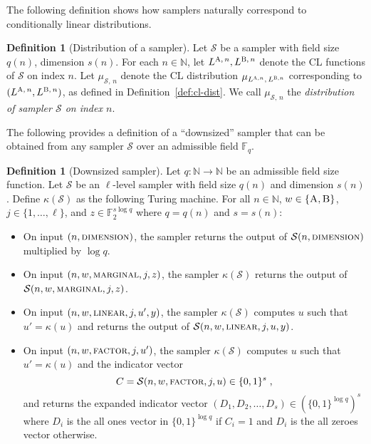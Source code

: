 \documentclass[11pt]{article}
\theoremstyle{definition}
\newtheorem{definition}[theorem]{Definition}
\newcommand{\N}{\ensuremath{\mathbb{N}}}
\newcommand{\F}{\ensuremath{\mathbb{F}}}
\newcommand{\downsize}{\kappa}
\newcommand{\sampler}{\mathcal{S}}
\newcommand{\gamestyle}[1]{\ensuremath{\textsc{#1}}\xspace}
\newcommand{\labelstyle}[1]{\ensuremath{\textsc{#1}}\xspace}
\newcommand{\alice}{\labelstyle{A}}
\newcommand{\bob}{\labelstyle{B}}
\begin{document}
The following definition shows how samplers naturally correspond to
conditionally linear distributions.
\begin{definition}[Distribution of a sampler]
  \label{def:sampler-sample}
  Let $\sampler$ be a sampler with field size $q(n)$, dimension $s(n)$.
  For each $n \in \N$, let $L^{\alice,\, n}, L^{\bob,\, n}$ denote the CL
  functions of $\sampler$ on index $n$.
  Let $\mu_{\sampler,\, n}$ denote the CL distribution $\mu_{L^{\alice, n},\,
    L^{\bob, n}}$ corresponding to $(L^{\alice,\, n}, L^{\bob,\, n})$, as defined in Definition~\ref{def:cl-dist}.
  We call $\mu_{\sampler,\, n}$ the \emph{distribution of sampler $\sampler$ on
    index $n$}.
\end{definition}

The following provides a definition of a ``downsized'' sampler that can be
obtained from any sampler $\sampler$ over an admissible field $\F_q$.
\begin{definition}[Downsized sampler]
  \label{def:downsize_sampler}
	Let $q: \N \to \N$ be an admissible field size function.
  Let $\sampler$ be an $\ell$-level sampler with field size $q(n)$ and dimension
  $s(n)$.
  Define $\downsize(\sampler)$ as the following Turing machine.
  For all $n \in \N$, $w \in \{\alice,\bob\}$, $j \in \{1,\ldots,\ell\}$, and $z
  \in \F_2^{s \log q}$ where $q = q(n)$ and $s = s(n)$:
	\begin{itemize}
  \item On input $(n, \gamestyle{dimension})$, the sampler returns the output of
    $\sampler(n, \gamestyle{dimension})$ multiplied by $\log q$.
		
	\item On input $(n, w, \gamestyle{marginal}, j, z)$, the sampler
    $\downsize(\sampler)$ returns the output of $\sampler(n, w,
    \gamestyle{marginal}, \penalty-2000 j, z)$.
		
			 \item On input $(n, w, \gamestyle{linear}, j, u', y)$, the sampler  $\downsize(\sampler)$  computes $u$ such that $u' = \downsize(u)$ and returns the output of $\sampler(n, w, \gamestyle{linear}, j, u, y)$.
		
	\item On input $(n, w, \gamestyle{factor}, j, u')$, the sampler
    $\downsize(\sampler)$ computes $u$ such that $u' = \downsize(u)$ and the
    indicator vector
    \[
      C = \sampler(n, w, \gamestyle{factor}, j, u) \in \{0,1\}^s\;,
    \]
    and returns the expanded indicator vector $(D_1, D_2, \ldots, D_s) \in (\{0,
    1\}^{\log q})^s$ where $D_i$ is the all ones vector in $\{0, 1\}^{\log q}$
    if $C_i = 1$ and $D_i$ is the all zeroes vector otherwise.
  \end{itemize}
\end{definition}
\end{document}
